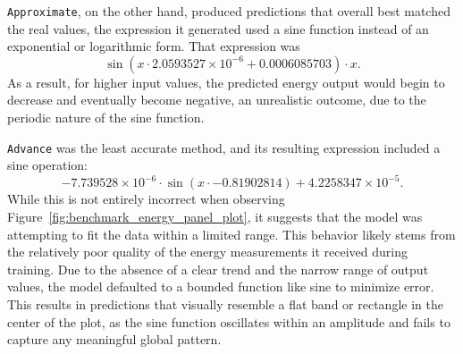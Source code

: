 \texttt{Approximate}, on the other hand, produced predictions that overall best matched the real values, the expression it generated used a sine function instead of an exponential or logarithmic form. That expression was  
\[
\sin\left(x \cdot 2.0593527 \times 10^{-6} + 0.0006085703\right) \cdot x.
\]  
As a result, for higher input values, the predicted energy output would begin to decrease and eventually become negative, an unrealistic outcome, due to the periodic nature of the sine function.

\texttt{Advance} was the least accurate method, and its resulting expression included a sine operation:  
\[
-7.739528 \times 10^{-6} \cdot \sin(x \cdot -0.81902814) + 4.2258347 \times 10^{-5}.
\]  
While this is not entirely incorrect when observing Figure~\ref{fig:benchmark_energy_panel_plot}, it suggests that the model was attempting to fit the data within a limited range. This behavior likely stems from the relatively poor quality of the energy measurements it received during training. Due to the absence of a clear trend and the narrow range of output values, the model defaulted to a bounded function like sine to minimize error. This results in predictions that visually resemble a flat band or rectangle in the center of the plot, as the sine function oscillates within an amplitude and fails to capture any meaningful global pattern.


